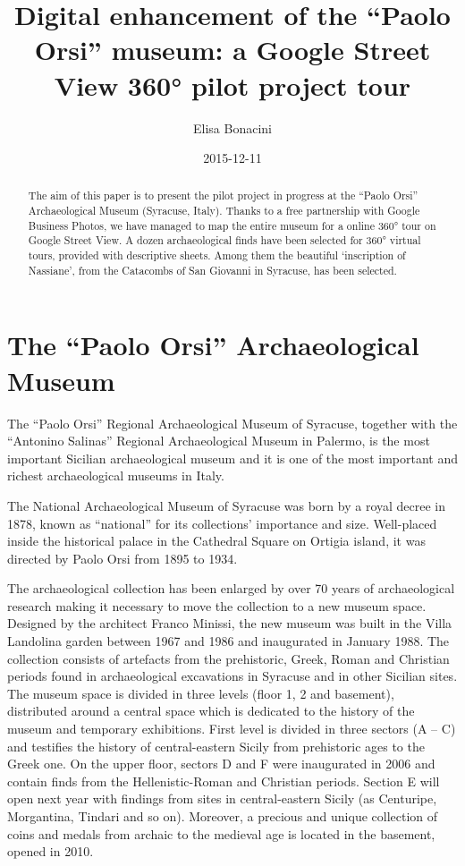 \documentclass[amsthm,ebook]{saparticle}
\title{Digital enhancement of the ``Paolo Orsi'' museum: a Google Street View 360° pilot project tour}
\author[catania]{Elisa Bonacini\corref{first}}
\date{2015-12-11}
\begin{document}
 
\maketitle
\begin{abstract}
The aim of this paper is to present the pilot project in progress at the ``Paolo Orsi'' Archaeological Museum
(Syracuse, Italy). Thanks to a free partnership with Google Business Photos, we have managed to map the entire museum
for a online 360° tour on Google Street View. A dozen archaeological finds have been selected for 360° virtual tours,
provided with descriptive sheets. Among them the beautiful `inscription of Nassiane', from the Catacombs of San
Giovanni in Syracuse, has been selected.
\end{abstract}


\section{The ``Paolo Orsi'' Archaeological Museum}


The ``Paolo Orsi'' Regional Archaeological Museum of Syracuse, together with the ``Antonino Salinas'' Regional
Archaeological Museum in Palermo, is the most important Sicilian archaeological museum and it is one of the most
important and richest archaeological museums in Italy. 

The National Archaeological Museum of Syracuse was born by a royal decree in 1878, known as ``national'' for its
collections’ importance and size. Well-placed inside the historical palace in the Cathedral Square on Ortigia island,
it was directed by Paolo Orsi from 1895 to 1934. 

The archaeological collection has been enlarged by over 70 years of archaeological research making it necessary to move
the collection to a new museum space. Designed by the architect Franco Minissi, the new museum was built in the Villa
Landolina garden between 1967 and 1986 and inaugurated in January 1988. The collection consists of artefacts from the
prehistoric, Greek, Roman and Christian periods found in archaeological excavations in Syracuse and in other Sicilian
sites. The museum space is divided in three levels (floor 1, 2 and basement), distributed around a central space which
is dedicated to the history of the museum and temporary exhibitions. First level is divided in three sectors (A – C)
and testifies the history of central-eastern Sicily from prehistoric ages to the Greek one. On the upper floor, sectors
D and F were inaugurated in 2006 and contain finds from the Hellenistic-Roman and Christian periods. Section E will
open next year with findings from sites in central-eastern Sicily (as Centuripe, Morgantina, Tindari and so on).
Moreover, a precious and unique collection of coins and medals from archaic to the medieval age is located in the
basement, opened in 2010.
\end{document}
